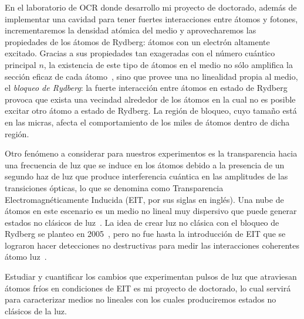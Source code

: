 \p En el laboratorio de OCR donde desarrollo mi proyecto de doctorado, además de implementar una cavidad para tener fuertes interacciones entre átomos y fotones, incrementaremos la densidad atómica del medio y aprovecharemos las propiedades de los átomos de Rydberg: átomos con un electrón altamente excitado. Gracias a sus propiedades tan exageradas con el número cuántico principal $n$, la existencia de este tipo de átomos en el medio no sólo amplifica la sección eficaz de cada átomo~\cite{changde}, sino que provee una no linealidad propia al medio, el \emph{bloqueo de Rydberg}: la fuerte interacción entre átomos en estado de Rydberg provoca que exista una vecindad alrededor de los átomos en la cual no es posible excitar otro átomo a estado de Rydberg. La región de bloqueo, cuyo tamaño está en las micras, afecta el comportamiento de los miles de átomos dentro de dicha región.

\p Otro fenómeno a considerar para nuestros experimentos es la transparencia hacia una frecuencia de luz que se induce en los átomos debido a la presencia de un segundo haz de luz que produce interferencia cuántica en las amplitudes de las transiciones ópticas, lo que se denomina como Transparencia Electromagnéticamente Inducida (EIT, por sus siglas en inglés). Una nube de átomos en este escenario es un medio no lineal muy dispersivo que puede generar estados no clásicos de luz~\cite{zhu}. La idea de crear luz no clásica con el bloqueo de Rydberg se planteo en 2005~\cite{friedler}, pero no fue hasta la introducción de EIT que se lograron hacer detecciones no destructivas para medir las interacciones coherentes átomo luz~\cite{mohapatra,dudin,peyronel,maxwell}.

\p Estudiar y cuantificar los cambios que experimentan pulsos de luz que atraviesan átomos fríos en condiciones de EIT es mi proyecto de doctorado, lo cual servirá para caracterizar medios no lineales con los cuales produciremos estados no clásicos de la luz.